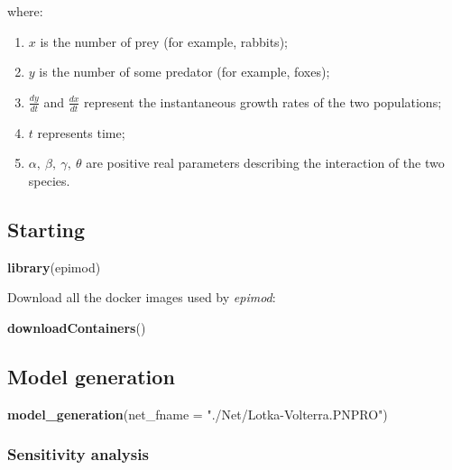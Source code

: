 \documentclass[
]{article}
\newenvironment{Shaded}{\begin{snugshade}}{\end{snugshade}}
\newcommand{\DataTypeTok}[1]{\textcolor[rgb]{0.13,0.29,0.53}{#1}}
\newcommand{\KeywordTok}[1]{\textcolor[rgb]{0.13,0.29,0.53}{\textbf{#1}}}
\newcommand{\NormalTok}[1]{#1}
\newcommand{\StringTok}[1]{\textcolor[rgb]{0.31,0.60,0.02}{#1}}
\providecommand{\tightlist}{%
  \setlength{\itemsep}{0pt}\setlength{\parskip}{0pt}}
\begin{document}
where:

\begin{enumerate}
\def\labelenumi{\arabic{enumi}.}
\tightlist
\item
  \(x\) is the number of prey (for example, rabbits);
\item
  \(y\) is the number of some predator (for example, foxes);
\item
  \(\frac{dy}{dt}\) and \(\frac{dx}{dt}\) represent the instantaneous
  growth rates of the two populations;
\item
  \(t\) represents time;
\item
  \(\alpha,\ \beta,\ \gamma,\ \theta\) are positive real parameters
  describing the interaction of the two species.
\end{enumerate}

\hypertarget{starting}{%
\subsection{Starting}\label{starting}}

\begin{Shaded}
\begin{Highlighting}[]
\KeywordTok{library}\NormalTok{(epimod)}
\end{Highlighting}
\end{Shaded}

Download all the docker images used by \emph{epimod}:

\begin{Shaded}
\begin{Highlighting}[]
\KeywordTok{downloadContainers}\NormalTok{()}
\end{Highlighting}
\end{Shaded}

\hypertarget{model-generation}{%
\subsection{Model generation}\label{model-generation}}

\begin{Shaded}
\begin{Highlighting}[]

\KeywordTok{model_generation}\NormalTok{(}\DataTypeTok{net_fname =} \StringTok{"./Net/Lotka-Volterra.PNPRO"}\NormalTok{)}
\end{Highlighting}
\end{Shaded}

\hypertarget{sensitivity-analysis}{%
\subsubsection{Sensitivity analysis}\label{sensitivity-analysis}}
\end{document}
